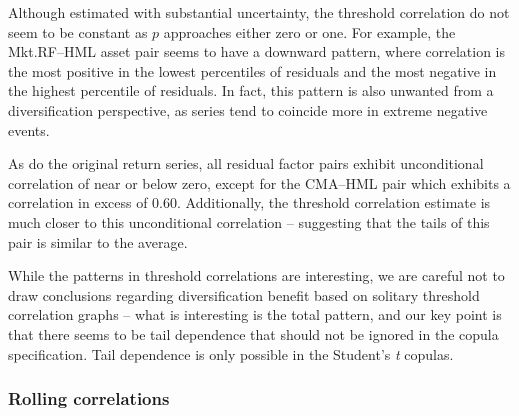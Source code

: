 Although estimated with substantial uncertainty, the threshold correlation do not seem to be constant as $p$ approaches either zero or one. For example, the Mkt.RF--HML asset pair seems to have a downward pattern, where correlation is the most positive in the lowest percentiles of residuals and the most negative in the highest percentile of residuals. In fact, this pattern is also unwanted from a diversification perspective, as series tend to coincide more in extreme negative events. 

As do the original return series, all residual factor pairs exhibit unconditional correlation of near or below zero, except for the CMA--HML pair which exhibits a correlation in excess of $0.60$. Additionally, the threshold correlation estimate is much closer to this unconditional correlation -- suggesting that the tails of this pair is similar to the average.

While the patterns in threshold correlations are interesting, we are careful not to draw conclusions regarding diversification benefit based on solitary threshold correlation graphs -- what is interesting is the total pattern, and our key point is that there seems to be tail dependence that should not be ignored in the copula specification. Tail dependence is only possible in the Student's \textit{t} copulas.

\subsubsection{Rolling correlations}

